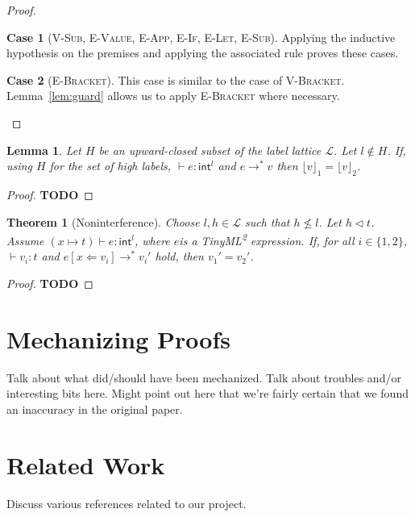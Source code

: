 \documentclass[a4paper]{article}
\newcommand{\langName}[0]{TinyML\textsuperscript{2}}
\newcommand{\typeRule}[3]{#1 \vdash #2 \colon #3}
\newcommand{\guards}[0]{\lhd}
\newcommand{\lift}[1]{\lfloor #1 \rfloor}
\theoremstyle{plain}
\newtheorem{thm}{Theorem}
\newtheorem{lemma}{Lemma}
\theoremstyle{definition}
\newtheorem*{case}{Case}
\begin{document}
\begin{proof}
  \begin{case}[\textsc{V-Sub}, \textsc{E-Value}, \textsc{E-App}, \textsc{E-If},
    \textsc{E-Let}, \textsc{E-Sub}]
    Applying the inductive hypothesis on the premises and applying the
    associated rule proves these cases.
  \end{case}

  \begin{case}[\textsc{E-Bracket}]
    This case is similar to the case of \textsc{V-Bracket}.
    Lemma~\ref{lem:guard} allows us to apply \textsc{E-Bracket} where necessary.
  \end{case}
\end{proof}

\begin{lemma}
  Let $H$ be an upward-closed subset of the label lattice $\mathcal{L}$.  Let $l
  \not\in H$.  If, using $H$ for the set of high labels, $\typeRule{
  }{e}{\textsf{int}^l}$ and $e \to^* v$ then $\lift{v}_1 = \lift{v}_2$.
\end{lemma}
\begin{proof}
  \textbf{TODO}
\end{proof}

\begin{thm}[Noninterference]
  Choose $l, h \in \mathcal{L}$ such that $h \not\leq l$.  Let $h \guards t$.
  Assume $\typeRule{(x \mapsto t)}{e}{\textsf{int}^l}$, where $e$is a \langName
  expression.  If, for all $i \in \{1, 2\}$, $\typeRule{ }{v_i}{t}$ and $e[x
  \Leftarrow v_i] \to^* v_i'$ hold, then $v_1' = v_2'$.
\end{thm}
\begin{proof}
  \textbf{TODO}
\end{proof}

\section{Mechanizing Proofs}
\label{sec:mechanizing}

Talk about what did/should have been mechanized.  Talk about troubles and/or
interesting bits here.  Might point out here that we're fairly certain that we
found an inaccuracy in the original paper.

\section{Related Work}
\label{sec:related}

Discuss various references related to our project.
\end{document}
